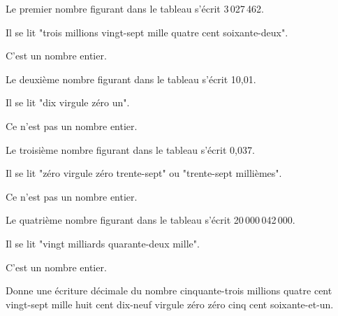 \begin{methode*1}
\begin{exemple*1}
Le premier nombre figurant dans le tableau s'écrit 3\,027\,462.

Il se lit "trois millions vingt-sept mille quatre cent soixante-deux".

C'est un nombre entier.
\end{exemple*1}

\begin{exemple*1}
Le  deuxième nombre figurant dans le tableau s’écrit 10,01.

Il se lit "dix virgule zéro un".

Ce n’est pas un nombre entier.
\end{exemple*1}

\begin{exemple*1}
Le troisième nombre figurant dans le tableau s’écrit 0,037.

Il se lit "zéro virgule zéro trente-sept" ou "trente-sept millièmes".

Ce n’est pas un nombre entier.
\end{exemple*1}

\begin{exemple*1}
Le quatrième nombre figurant dans le tableau s’écrit 20\,000\,042\,000.

Il se lit "vingt milliards quarante-deux mille".

C’est un nombre entier.
\end{exemple*1}

\exercice 

Donne une écriture décimale du nombre cinquante-trois millions quatre cent vingt-sept mille huit cent dix-neuf virgule zéro zéro cinq cent soixante-et-un.

\end{methode*1}


